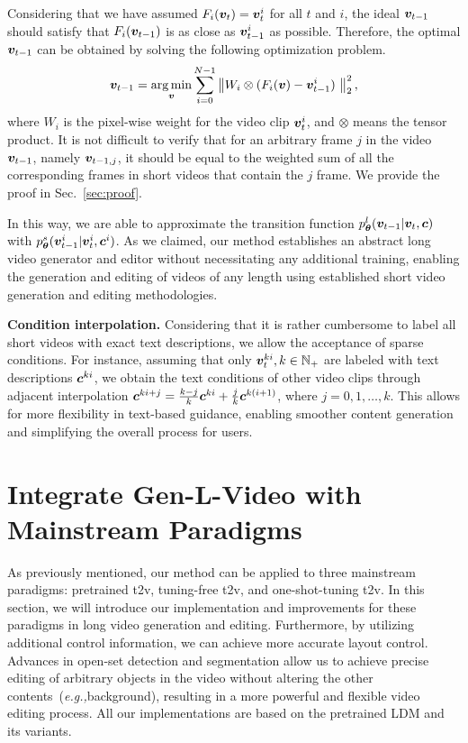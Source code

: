 \documentclass{article}
\def\eg{\emph{e.g.,}}
\begin{document}
Considering that we have assumed $F_{i}({\bm{v}}_t) = {\bm{v}}_{t}^i$ for all $t$ and $i$, the ideal ${\bm{v}}_{t-1}$ should satisfy that $F_{i}({\bm{v}}_{t-1})$ is as close as ${\bm{v}}_{t-1}^i$ as possible. Therefore, the optimal ${\bm{v}}_{t-1}$ can be obtained by solving the following optimization problem.
\begin{align*}\label{eq:inversion function}
    {\bm{v}}_{t-1} = \mathop{\arg\min}_{{\bm{v}}}\sum_{i=0}^{N-1}\left\|W_i \otimes (F_i({\bm{v}})-{\bm{v}}_{t-1}^i)\ \right\|_2^2,
\end{align*}
where $W_i$ is the pixel-wise weight for the video clip ${\bm{v}}^i_{t}$, and $\otimes$ means the tensor product. It is not difficult to verify that for an arbitrary frame $j$ in the video ${\bm{v}}_{t-1}$, namely ${\bm{v}}_{t-1,j}$, it should be equal to the weighted sum of all the corresponding frames in short videos that contain the $j$ frame. We provide the proof in Sec.~\ref{sec:proof}.

In this way, we are able to approximate the transition function $p_{\bm{\theta}}^l({\bm{v}}_{t-1}|{\bm{v}}_{t},{\bm{c}})$ with $p^s_{{\bm{\theta}}}({\bm{v}}^i_{t-1}|{\bm{v}}^i_{t},{\bm{c}}^i)$. As we claimed, our method establishes an abstract long video generator and editor without necessitating any additional training, enabling the generation and editing of videos of any length using established short video generation and editing methodologies.

\textbf{Condition interpolation.}  Considering that it is rather cumbersome to label all short videos with exact text descriptions, we allow the acceptance of sparse conditions. For instance, assuming that only ${\bm{v}}_{t}^{k i }, k\in \mathbb N_{+}$ are labeled with text descriptions ${\bm{c}}^{ki}$, we obtain the text conditions of other video clips through adjacent interpolation ${\bm{c}}^{ki+j} = \frac{k-j}{k}{\bm{c}}^{ki}+\frac{j}{k}{\bm{c}}^{k(i+1)}$, where $j=0,1,\dots,k$. This allows for more flexibility in text-based guidance, enabling smoother content generation and simplifying the overall process for users.


\section{Integrate Gen-L-Video with Mainstream Paradigms}\label{sec:application}
As previously mentioned, our method can be applied to three mainstream paradigms: pretrained t2v, tuning-free t2v, and one-shot-tuning t2v. In this section, we will introduce our implementation and improvements for these paradigms in long video generation and editing. Furthermore, by utilizing additional control information, we can achieve more accurate layout control. Advances in open-set detection and segmentation allow us to achieve precise editing of arbitrary objects in the video without altering the other contents~(\eg background), resulting in a more powerful and flexible video editing process. All our implementations are based on the pretrained LDM and its variants. 
\end{document}
